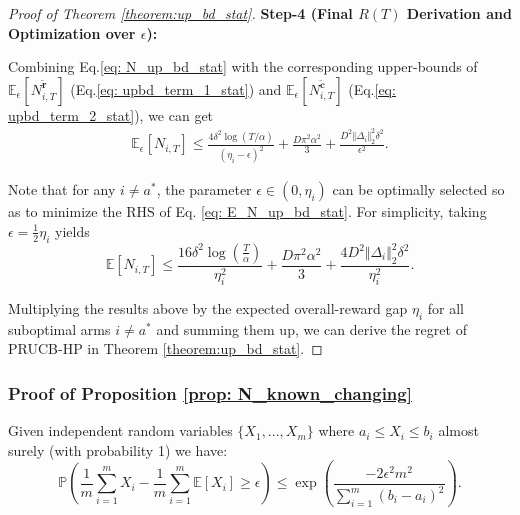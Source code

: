 \begin{proof}[Proof of Theorem \ref{theorem:up_bd_stat}]
\textbf{Step-4 (Final $R(T)$ Derivation and Optimization over $\epsilon$):}

Combining Eq.\ref{eq: N_up_bd_stat} with the corresponding upper-bounds of $\mathbb{E}_{\epsilon} \left[ N_{i,T}^{\widetilde{\boldsymbol{r}}} \right]$ (Eq.\ref{eq: upbd_term_1_stat}) and $\mathbb{E}_{\epsilon} \left[ N_{i,T}^{\widetilde{\boldsymbol{c}}} \right]$ (Eq.\ref{eq: upbd_term_2_stat}), we can get
\begin{equation}
\begin{aligned}
\label{eq: E_N_up_bd_stat}
\mathbb{E}_{\epsilon} [N_{i,T}]
\leq
\frac{4 \delta^2 \log (T/\alpha)}{(\eta_{i} - \epsilon)^2}
+
\frac{D \pi^2 \alpha^2}{3}
+
\frac{ D^2 \Vert \Delta_{i} \Vert_2^2 \delta^2 }{ \epsilon^2 }.
\end{aligned}
\end{equation} 


Note that for any $i \neq a^*$, the parameter $\epsilon \in (0, \eta_{i})$ can be optimally selected so as to minimize the RHS of Eq. \ref{eq: E_N_up_bd_stat}. 
For simplicity, taking $\epsilon = \frac{1}{2} \eta_{i}$ yields
\[
\mathbb{E}[N_{i,T}] 
\leq
\frac{16 \delta^2 \log{(\frac{T}{\alpha})}}{\eta_{i}^2} 
+
\frac{D \pi^2 \alpha^2} {3}
+
\frac{ 4 D^2 \Vert \Delta_{i} \Vert_2^2 \delta^2 }{ \eta_{i}^2 }
.
\]


Multiplying the results above by the expected overall-reward gap $\eta_i$ for all suboptimal arms $i \neq a^*$ and summing them up, we can derive the regret of PRUCB-HP in Theorem \ref{theorem:up_bd_stat}.
\end{proof}

\subsubsection{Proof of Proposition \ref{prop: N_known_changing}}
\label{sec: app_pr_prop_N_known_changing}

\begin{lemma}
\label{lemma: Hoeffding}
 Given independent random variables $\{X_1, ..., X_m \}$ where $a_i \leq X_i \leq b_i$ almost surely (with probability 1) we have:
\[
\mathbb{P} \left(\frac{1}{m} \sum_{i=1}^{m} X_i - \frac{1}{m} \sum_{i=1}^{m} \mathbb{E}[X_i] \geq \epsilon \right) \leq \exp \left(\frac{-2 \epsilon^2 m^2}{\sum_{i=1}^{m} (b_i-a_i)^2} \right).
\]
\end{lemma}

